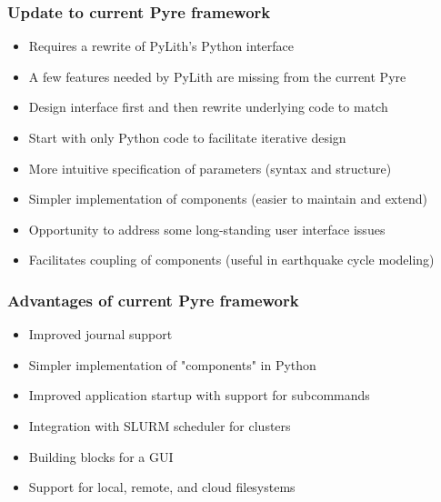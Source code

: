 \documentclass[aspectratio=169]{beamer}
\begin{document}
\begin{frame}
  \frametitle{Update to current Pyre framework}
  \summary{}

  \begin{itemize}
    \begin{itemize}
      \item Requires a rewrite of PyLith's Python interface
      \item A few features needed by PyLith are missing from the current Pyre
    \end{itemize}
    \begin{itemize}
      \item Design interface first and then rewrite underlying code to match
      \item Start with only Python code to facilitate iterative design
    \end{itemize}
    \begin{itemize}
      \item More intuitive specification of parameters (syntax and structure)
      \item Simpler implementation of components (easier to maintain and extend)
      \item Opportunity to address some long-standing user interface issues
      \item Facilitates coupling of components (useful in earthquake cycle modeling)
    \end{itemize}
  \end{itemize}
  
\end{frame}


\begin{frame}
  \frametitle{Advantages of current Pyre framework}

  \begin{itemize}
  \item Improved journal support
  \item Simpler implementation of "components" in Python
  \item Improved application startup with support for subcommands
  \item Integration with SLURM scheduler for clusters
  \item Building blocks for a GUI
  \item Support for local, remote, and cloud filesystems
\end{itemize}

\end{frame}
\end{document}

